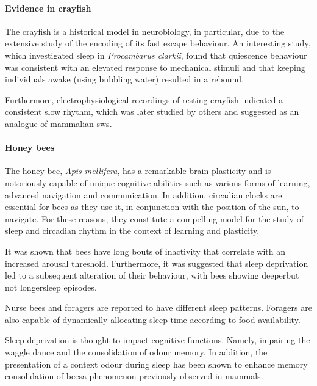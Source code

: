 \paragraph*{Evidence in crayfish}
The crayfish is a historical model in neurobiology, in particular,
due to the extensive study of the encoding of its fast escape behaviour\cite{edwards_fifty_1999}.
An interesting study, which investigated sleep in \emph{Procambarus clarkii}, found that  quiescence behaviour was consistent with an elevated response to mechanical stimuli and that keeping individuals awake (using bubbling water) resulted in a rebound\cite{ramon_slow_2004}.

Furthermore, electrophysiological recordings of resting crayfish indicated a consistent slow rhythm, 
which was later studied by others\cite{mendoza-angeles_slow_2007,mendoza-angeles_slow_2010} and suggested as an analogue of mammalian \gls{sws}.



\paragraph*{Honey bees}
The honey bee, \emph{Apis mellifera}, has a remarkable
brain plasticity and is notoriously capable of unique cognitive abilities such as various forms of learning, advanced navigation and communication\cite{srinivasan_honey_2010,menzel_honeybee_2012,howard_numerical_2018}.
In addition, circadian clocks are essential for bees as they use it, in conjunction with the position of the sun, to navigate\cite{frisch_dance_1967,homberg_search_2004}. 
For these reasons, they constitute a compelling model for the study of sleep and circadian rhythm in the context of learning and plasticity.


It was shown that bees have long bouts of inactivity that correlate with an increased arousal threshold\cite{kaiser_neuronal_1983,kaiser1985comparative,kaiser1988electromyographic}.
Furthermore, it was suggested that sleep deprivation led to a subsequent alteration of their behaviour, with bees showing deeper\emd{}but not longer\emd{}sleep episodes\cite{sauer_sleep_2004}.

Nurse bees and foragers are reported to have different sleep patterns\cite{eban-rothschild_differences_2008}.
Foragers are also capable of dynamically allocating sleep time according to food availability\cite{klein_work_2011}.

Sleep deprivation is thought to impact cognitive functions. 
Namely, impairing the waggle dance\cite{klein_sleep_2010} and the
consolidation of odour memory\cite{hussaini_sleep_2009}.
In addition, the presentation of a context odour during sleep has been shown to enhance memory consolidation of bees\cite{zwaka_context_2015}\emd{}a phenomenon previously observed in mammals\cite{rasch_odor_2007}.


